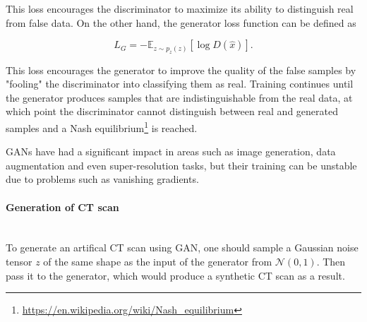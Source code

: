 This loss encourages the discriminator to maximize its ability to distinguish real from false data. On the other hand, the generator loss function can be defined as

\begin{equation}
L_G = - \mathbb{E}_{z \sim p_z(z)}[\log D(\hat{x})].
\end{equation}


This loss encourages the generator to improve the quality of the false samples by "fooling" the discriminator into classifying them as real. Training continues until the generator produces samples that are indistinguishable from the real data, at which point the discriminator cannot distinguish between real and generated samples and a Nash equilibrium\footnote{\url{https://en.wikipedia.org/wiki/Nash_equilibrium}} is reached.

GANs have had a significant impact in areas such as image generation, data augmentation and even super-resolution tasks, but their training can be unstable due to problems such as vanishing gradients. 


\paragraph{Generation of CT scan}\mbox{}\\

To generate an artifical CT scan using GAN, one should sample a Gaussian noise tensor $z$ of the same shape as the input of the generator from $\mathcal{N}(0,1)$. Then pass it to the generator, which would produce a synthetic CT scan as a result.